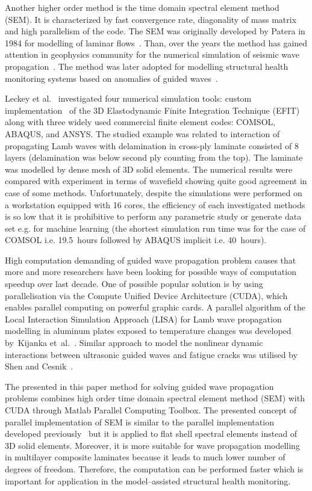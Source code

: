 \documentclass[preprint,12pt]{elsarticle}
\begin{document}
	Another higher order method is the time domain spectral element method (SEM). It is characterized by fast convergence rate, diagonality of mass matrix and high parallelism of the code. The SEM was originally developed by Patera in 1984 for modelling of laminar flows~\cite{Patera1984}. Than, over the years the method has gained attention in geophysics community for the numerical simulation of seismic wave propagation~\cite{Seriani1998,Komatitsch2009}. The method was later adopted for modelling structural health monitoring systems based on anomalies of guided waves~\cite{Schulte2010,Ostachowicz2012,Lonkar2013}. 
	
	Leckey et al.~\cite{Leckey2018} investigated four numerical simulation tools: custom implementation~\cite{Leckey2014} of the 3D Elastodynamic Finite Integration Technique (EFIT) \cite{Schubert1998} along with three widely used commercial finite element codes: COMSOL, ABAQUS, and ANSYS. The studied example was related to interaction of propagating Lamb waves with delamination in cross-ply laminate consisted of 8 layers (delamination was below second ply counting from the top). The laminate was modelled by dense mesh of 3D solid elements. The numerical results were compared with experiment in terms of wavefield showing quite good agreement in case of some methods. Unfortunately, despite the simulations were performed on a workstation equipped with 16 cores, the efficiency of each investigated methods is so low that it is prohibitive to perform any parametric study or generate data set e.g. for machine learning (the shortest simulation run time was for the case of COMSOL i.e. 19.5~hours followed by ABAQUS implicit i.e. 40~hours).
	
	High computation demanding of guided wave propagation problem causes that more and more researchers have been looking for possible ways of computation speedup over last decade. One of possible popular solution is by using parallelisation via the Compute Unified Device Architecture (CUDA), which enables parallel computing on powerful graphic cards. A parallel algorithm of the Local Interaction Simulation Approach (LISA) for Lamb wave propagation modelling in aluminum plates exposed to temperature changes was developed by~Kijanka et~al.~\cite{Kijanka2013}. Similar approach to model the nonlinear dynamic interactions between ultrasonic guided waves and fatigue cracks was utilised by Shen and Cesnik~\cite{Shen2017}.  
	
	The presented in this paper method for solving guided wave propagation problems combines high order time domain spectral element method (SEM) with CUDA through Matlab Parallel Computing Toolbox. The presented concept of parallel implementation of SEM is similar to the parallel implementation developed previously~\cite{Kudela2016} but it is applied to flat shell spectral elements instead of 3D solid elements. Moreover, it is more suitable for wave propagation modelling in multilayer composite laminates because it leads to much lower number of degrees of freedom. Therefore, the computation can be performed faster which is important for application in the model--assisted structural health monitoring.
	
\end{document}
